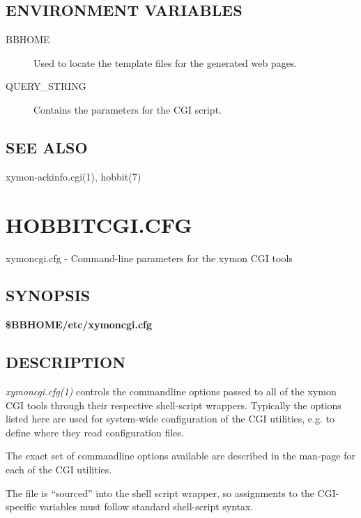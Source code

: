 \subsection{ENVIRONMENT VARIABLES}
\begin{description}
\item[BBHOME] Used to locate the template files for the generated web pages. 

 

\item[QUERY\_STRING] Contains the parameters for the CGI script. 


\end{description}
\subsection{SEE ALSO}
xymon-ackinfo.cgi(1), hobbit(7) 

%
%
\newpage
\section{HOBBITCGI.CFG}
 xymoncgi.cfg - Command-line parameters for the xymon CGI tools 

 
\subsection{SYNOPSIS}
\textbf{\$BBHOME/etc/xymoncgi.cfg}


 
\subsection{DESCRIPTION}
\emph{xymoncgi.cfg(1)}
 controls the commandline options passed to all of the xymon CGI tools through their respective shell-script wrappers. Typically the options listed here are used for system-wide configuration of the CGI utilities, e.g. to define where they read configuration files. 

  The exact set of commandline options available are described in the man-page for each of the CGI utilities. 


  The file is ``sourced'' into the shell script wrapper, so assignments to the CGI-specific variables must follow standard shell-script syntax. 


